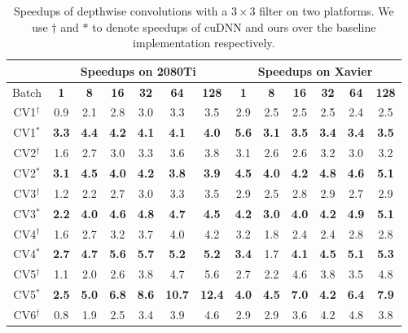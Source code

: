 \begin{table}[]
\setlength{\tabcolsep}{3.8pt}
\caption{Speedups of depthwise convolutions with a $3 \times 3$ filter on two platforms. We use ${\dag}$ and ${*}$ to denote speedups of cuDNN and ours over the baseline implementation respectively.}
\label{tab:dwconvf3}
\begin{threeparttable}
\begin{tabular}{c|cccccc|cccccc}
\toprule
&\multicolumn{6}{c|}{Speedups on 2080Ti} & \multicolumn{6}{c}{Speedups on Xavier}\\

\midrule
Batch& \textbf{1} & \textbf{8} & \textbf{16}& \textbf{32} & \textbf{64} & \textbf{128} & \textbf{1} & \textbf{8} & \textbf{16}& \textbf{32} & \textbf{64} & \textbf{128}\\
\hline
CV1$^{\dag}$&0.9 &2.1 &2.8 &3.0 &3.3 &3.5 &2.9 &2.5 &2.5 &2.5 &2.4 &2.5 \\
CV1$^{*}$&\textbf{3.3} &\textbf{4.4} &\textbf{4.2} &\textbf{4.1} &\textbf{4.1} &\textbf{4.0} &\textbf{5.6} &\textbf{3.1} &\textbf{3.5} &\textbf{3.4} &\textbf{3.4} &\textbf{3.5} \\
\hline
CV2$^{\dag}$&1.6 &2.7 &3.0 &3.3 &3.6 &3.8 &3.1 &2.6 &2.6 &3.2 &3.0 &3.2 \\
CV2$^{*}$&\textbf{3.1} &\textbf{4.5} &\textbf{4.0} &\textbf{4.2} &\textbf{3.8} &\textbf{3.9} &\textbf{4.5} &\textbf{4.0} &\textbf{4.2} &\textbf{4.8} &\textbf{4.6} &\textbf{5.1} \\
\hline
CV3$^{\dag}$&1.2 &2.2 &2.7 &3.0 &3.3 &3.5 &2.9 &2.5 &2.8 &2.9 &2.7 &2.9 \\
CV3$^{*}$&\textbf{2.2} &\textbf{4.0} &\textbf{4.6} &\textbf{4.8} &\textbf{4.7} &\textbf{4.5} &\textbf{4.2} &\textbf{3.0} &\textbf{4.0} &\textbf{4.2} &\textbf{4.9} &\textbf{5.1} \\
\hline
CV4$^{\dag}$&1.6 &2.7 &3.2 &3.7 &4.0 &4.2 &3.2 &1.8 &2.4 &2.4 &2.8 &2.8 \\
CV4$^{*}$&\textbf{2.7} &\textbf{4.7} &\textbf{5.6} &\textbf{5.7} &\textbf{5.2} &\textbf{5.2} &\textbf{3.4} &1.7 &\textbf{4.1} &\textbf{4.5} &\textbf{5.1} &\textbf{5.3} \\
\hline
CV5$^{\dag}$&1.1 &2.0 &2.6 &3.8 &4.7 &5.6 &2.7 &2.2 &4.6 &3.8 &3.5 &4.8 \\
CV5$^{*}$&\textbf{2.5} &\textbf{5.0} &\textbf{6.8} &\textbf{8.6} &\textbf{10.7} &\textbf{12.4} &\textbf{4.0} &\textbf{4.5} &\textbf{7.0} &\textbf{4.2} &\textbf{6.4} &\textbf{7.9} \\
\hline
CV6$^{\dag}$&0.8 &1.9 &2.5 &3.4 &3.9 &4.6 &2.9 &2.9 &3.6 &4.2 &4.8 &3.8 \\

\end{tabular}
\end{threeparttable}
\end{table}
